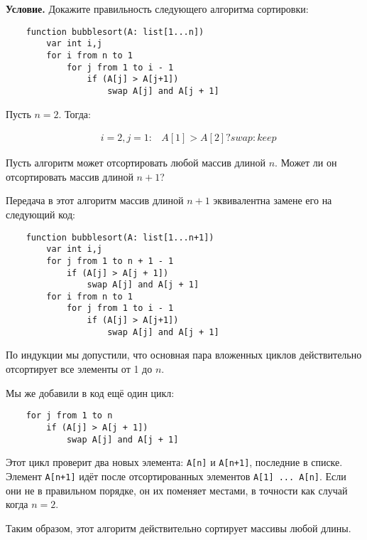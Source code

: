 \documentclass{article}
\begin{document}
\textbf{Условие.}
Докажите правильность следующего алгоритма сортировки:

\begin{lstlisting}
    function bubblesort(A: list[1...n])
        var int i,j
        for i from n to 1
            for j from 1 to i - 1
                if (A[j] > A[j+1])
                    swap A[j] and A[j + 1]
\end{lstlisting}

Пусть \(n = 2\).
Тогда:

\begin{eqnarray}
    &i = 2, j = 1:& A[1] > A[2] ? swap : keep
\end{eqnarray}

Пусть алгоритм может отсортировать любой массив длиной \(n\).
Может ли он отсортировать массив длиной \(n+1\)?

Передача в этот алгоритм массив длиной \(n+1\) эквивалентна замене его на следующий код:

\begin{lstlisting}
    function bubblesort(A: list[1...n+1])
        var int i,j
        for j from 1 to n + 1 - 1
            if (A[j] > A[j + 1])
                swap A[j] and A[j + 1]
        for i from n to 1
            for j from 1 to i - 1
                if (A[j] > A[j+1])
                    swap A[j] and A[j + 1]        
\end{lstlisting}

По индукции мы допустили, что основная пара вложенных циклов действительно отсортирует
все элементы от 1 до \(n\).

Мы же добавили в код ещё один цикл:

\begin{lstlisting}
    for j from 1 to n
        if (A[j] > A[j + 1])
            swap A[j] and A[j + 1]
\end{lstlisting}

Этот цикл проверит два новых элемента: \texttt{A[n]} и \texttt{A[n+1]}, последние в списке.
Элемент \texttt{A[n+1]} идёт после отсортированных элементов \texttt{A[1] ... A[n]}.
Если они не в правильном порядке, он их поменяет местами, в точности как случай когда \(n = 2\).

Таким образом, этот алгоритм действительно сортирует массивы любой длины.
\end{document}
